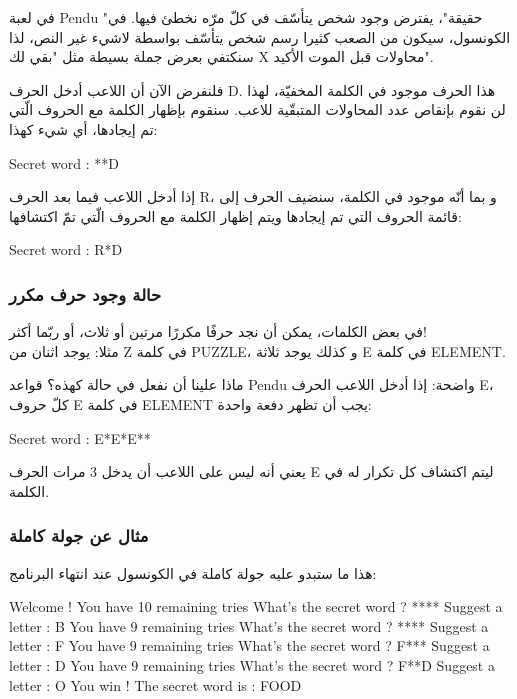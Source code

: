 \begin{information}
في لعبة
\textenglish{Pendu}
"حقيقة"، يفترض وجود شخص يتأسّف في كلّ مرّه نخطئ فيها. في الكونسول، سيكون من الصعب كثيرا رسم شخص يتأسّف بواسطة لاشيء غير النص،  لذا سنكتفي بعرض جملة بسيطة مثل "بقي لك
\textenglish{X}
محاولات قبل الموت الأكيد".
\end{information}

فلنفرض الآن أن اللاعب أدخل الحرف
\textenglish{D}.
هذا الحرف موجود في الكلمة المخفيّة، لهذا لن نقوم بإنقاص عدد المحاولات المتبقّية للاعب. سنقوم بإظهار الكلمة مع الحروف الّتي تم إيجادها، أي شيء كهذا:

\begin{Console}
Secret word : **D
\end{Console}

إذا أدخل اللاعب فيما بعد الحرف
\textenglish{R}،
و بما أنّه موجود في الكلمة، سنضيف الحرف إلى قائمة الحروف التي تم إيجادها ويتم إظهار الكلمة مع الحروف الّتي تمّ اكتشافها:

\begin{Console}
Secret word : R*D
\end{Console}

\subsubsection{حالة وجود حرف مكرر}

في بعض الكلمات، يمكن أن نجد حرفًا مكررًا مرتين أو ثلاث، أو ربّما أكثر!\\
مثلا: يوجد اثنان من
\textenglish{Z}
في كلمة
\textenglish{PUZZLE}،
و كذلك يوجد ثلاثة
\textenglish{E}
في كلمة
\textenglish{ELEMENT}.

ماذا علينا أن نفعل في حالة كهذه؟ قواعد
\textenglish{Pendu}
واضحة: إذا أدخل اللاعب الحرف
\textenglish{E}،
كلّ حروف
\textenglish{E}
في كلمة
\textenglish{ELEMENT}
يجب أن تظهر دفعة واحدة:

\begin{Console}
Secret word : E*E*E**
\end{Console}

يعني أنه ليس على اللاعب أن يدخل 3 مرات الحرف
\textenglish{E}
ليتم اكتشاف كل تكرار له في الكلمة.

\subsubsection{مثال عن جولة كاملة}

هذا ما ستبدو عليه جولة كاملة في الكونسول عند انتهاء البرنامج:

\begin{Console}
Welcome !
You have 10 remaining tries
What's the secret word ? ****
Suggest a letter : B
You have 9 remaining tries
What's the secret word ? ****
Suggest a letter : F
You have 9 remaining tries
What's the secret word ? F***
Suggest a letter : D
You have 9 remaining tries
What's the secret word ? F**D
Suggest a letter : O
You win ! The secret word is  : FOOD
\end{Console}

